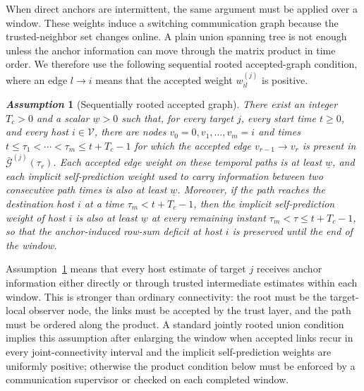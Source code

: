 \documentclass[letterpaper,journal]{IEEEtran}
\def\V{\mathcal{V}} %
\def\G{\mathcal{G}} %
\newtheorem{assumption}{\it Assumption}%
\begin{document}
When direct anchors are intermittent, the same argument must be applied over a window. These weights induce a switching communication graph because the trusted-neighbor set changes online. A plain union spanning tree is not enough unless the anchor information can move through the matrix product in time order. We therefore use the following sequential rooted accepted-graph condition, where an edge $l\to i$ means that the accepted weight $w_{il}^{(j)}$ is positive.
\begin{assumption}[Sequentially rooted accepted graph]\label{ass_graph}
There exist an integer $T_c>0$ and a scalar $\underline w>0$ such that, for every target $j$, every start time $t\ge0$, and every host $i\in\V$, there are nodes $v_0=0,v_1,\ldots,v_m=i$ and times $t\le \tau_1<\cdots<\tau_m\le t+T_c-1$ for which the accepted edge $v_{r-1}\to v_r$ is present in $\bar{\G}^{(j)}(\tau_r)$. Each accepted edge weight on these temporal paths is at least $\underline w$, and each implicit self-prediction weight used to carry information between two consecutive path times is also at least $\underline w$. Moreover, if the path reaches the destination host $i$ at a time $\tau_m<t+T_c-1$, then the implicit self-prediction weight of host $i$ is also at least $\underline w$ at every remaining instant $\tau_m<\tau\le t+T_c-1$, so that the anchor-induced row-sum deficit at host $i$ is preserved until the end of the window.
\end{assumption}
Assumption~\ref{ass_graph} means that every host estimate of target $j$ receives anchor information either directly or through trusted intermediate estimates within each window. This is stronger than ordinary connectivity: the root must be the target-local observer node, the links must be accepted by the trust layer, and the path must be ordered along the product. A standard jointly rooted union condition implies this assumption after enlarging the window when accepted links recur in every joint-connectivity interval and the implicit self-prediction weights are uniformly positive; otherwise the product condition below must be enforced by a communication supervisor or checked on each completed window.
\end{document}
